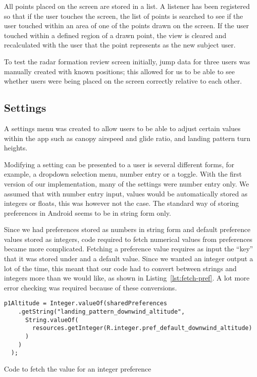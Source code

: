 All points placed on the screen are stored in a list. A listener has been registered so that if the user touches the screen, the list of points is searched to see if the user touched within an area of one of the points drawn on the screen. If the user touched within a defined region of a drawn point, the view is cleared and recalculated with the user that the point represents as the new subject user.

To test the radar formation review screen initially, jump data for three users was manually created with known positions; this allowed for us to be able to see whether users were being placed on the screen correctly relative to each other.

\subsection{Settings}
A settings menu was created to allow users to be able to adjust certain values within the app such as canopy airspeed and glide ratio, and landing pattern turn heights.

Modifying a setting can be presented to a user is several different forms, for example, a dropdown selection menu, number entry or a toggle. With the first version of our implementation, many of the settings were number entry only. We assumed that with number entry input, values would be automatically stored as integers or floats, this was however not the case. The standard way of storing preferences in Android seems to be in string form only.

Since we had preferences stored as numbers in string form and default preference values stored as integers, code required to fetch numerical values from preferences became more complicated.
Fetching a preference value requires as input the ``key'' that it was stored under and a default value. Since we wanted an integer output a lot of the time, this meant that our code had to convert between strings and integers more than we would like, as shown in Listing~\ref{lst:fetch-pref}. A lot more error checking was required because of these conversions.

\begin{listing}
  \centering
  \begin{verbatim}
p1Altitude = Integer.valueOf(sharedPreferences
    .getString("landing_pattern_downwind_altitude",
      String.valueOf(
        resources.getInteger(R.integer.pref_default_downwind_altitude)
      )
    )
  );
  \end{verbatim}
  \caption{Code to fetch the value for an integer preference}\label{lst:fetch-pref}
\end{listing}

